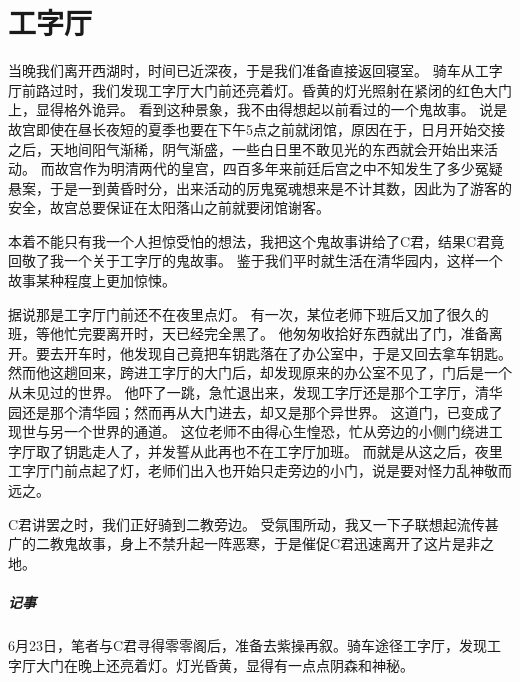 \chapter{工字厅}

当晚我们离开西湖时，时间已近深夜，于是我们准备直接返回寝室。
骑车从工字厅前路过时，我们发现工字厅大门前还亮着灯。昏黄的灯光照射在紧闭的红色大门上，显得格外诡异。
看到这种景象，我不由得想起以前看过的一个鬼故事。
说是故宫即使在昼长夜短的夏季也要在下午5点之前就闭馆，原因在于，日月开始交接之后，天地间阳气渐稀，阴气渐盛，一些白日里不敢见光的东西就会开始出来活动。
而故宫作为明清两代的皇宫，四百多年来前廷后宫之中不知发生了多少冤疑悬案，于是一到黄昏时分，出来活动的厉鬼冤魂想来是不计其数，因此为了游客的安全，故宫总要保证在太阳落山之前就要闭馆谢客。

本着不能只有我一个人担惊受怕的想法，我把这个鬼故事讲给了C君，结果C君竟回敬了我一个关于工字厅的鬼故事。
鉴于我们平时就生活在清华园内，这样一个故事某种程度上更加惊悚。

据说那是工字厅门前还不在夜里点灯。
有一次，某位老师下班后又加了很久的班，等他忙完要离开时，天已经完全黑了。
他匆匆收拾好东西就出了门，准备离开。要去开车时，他发现自己竟把车钥匙落在了办公室中，于是又回去拿车钥匙。
然而他这趟回来，跨进工字厅的大门后，却发现原来的办公室不见了，门后是一个从未见过的世界。
他吓了一跳，急忙退出来，发现工字厅还是那个工字厅，清华园还是那个清华园；然而再从大门进去，却又是那个异世界。
这道门，已变成了现世与另一个世界的通道。
这位老师不由得心生惶恐，忙从旁边的小侧门绕进工字厅取了钥匙走人了，并发誓从此再也不在工字厅加班。
而就是从这之后，夜里工字厅门前点起了灯，老师们出入也开始只走旁边的小门，说是要对怪力乱神敬而远之。

C君讲罢之时，我们正好骑到二教旁边。
受氛围所动，我又一下子联想起流传甚广的二教鬼故事，身上不禁升起一阵恶寒，于是催促C君迅速离开了这片是非之地。

\vfill

\paragraph{记事}
6月23日，笔者与C君寻得零零阁后，准备去紫操再叙。骑车途径工字厅，发现工字厅大门在晚上还亮着灯。灯光昏黄，显得有一点点阴森和神秘。
